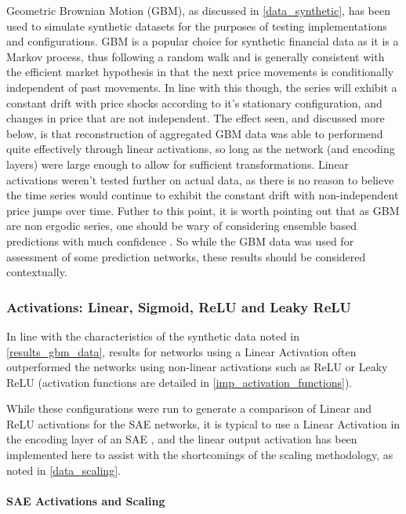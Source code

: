 \documentclass[a4paper,11pt,oneside]{article}
\theoremstyle{plain}
\theoremstyle{definition}
\begin{document}
Geometric Brownian Motion (GBM), as discussed in \ref{data_synthetic}, has been used to simulate synthetic datasets for the purposes of testing implementations and configurations. GBM is a popular choice for synthetic financial data as it is a Markov process, thus following a random walk and is generally consistent with the efficient market hypothesis in that the next price movements is conditionally independent of past movements. In line with this though, the series will exhibit a constant drift with price shocks according to it's stationary configuration, and changes in price that are not independent. The effect seen, and discussed more below, is that reconstruction of aggregated GBM data was able to performend quite effectively through linear activations, so long as the network (and encoding layers) were large enough to allow for sufficient transformations. Linear activations weren't tested further on actual data, as there is no reason to believe the time series would continue to exhibit the constant drift with non-independent price jumps over time. Futher to this point, it is worth pointing out that as GBM are non ergodic series, one should be wary of considering ensemble based predictions with much confidence \cite{Peters}. So while the GBM data was used for assessment of some prediction networks, these results should be considered contextually.

\subsubsection{Activations: Linear, Sigmoid, ReLU and Leaky ReLU}

In line with the characteristics of the synthetic data noted in \ref{results_gbm_data}, results for networks using a Linear Activation often outperformed the networks using non-linear activations such as ReLU or Leaky ReLU (activation functions are detailed in \ref{imp_activation_functions}). \newline

While these configurations were run to generate a comparison of Linear and ReLU activations for the SAE networks, it is typical to use a Linear Activation in the encoding layer of an SAE \cite{Hinton2}, and the linear output activation has been implemented here to assist with the shortcomings of the scaling methodology, as noted in \ref{data_scaling}.\newline

\paragraph{SAE Activations and Scaling}\label{results_sae_activations_scaling}
\end{document}
